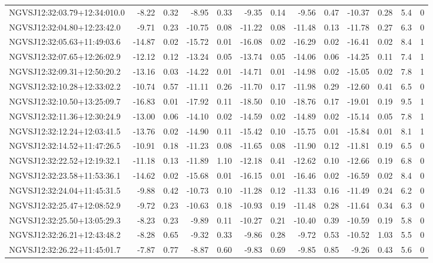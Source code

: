 \begin{tabular}{lrrrrrrrrrrcc}
NGVSJ12:32:03.79+12:34:010.0 & -8.22 & 0.32 & -8.95 & 0.33 & -9.35 & 0.14 & -9.56 & 0.47 & -10.37 & 0.28 & 5.4 & 0 \\
NGVSJ12:32:04.80+12:23:42.0 & -9.71 & 0.23 & -10.75 & 0.08 & -11.22 & 0.08 & -11.48 & 0.13 & -11.78 & 0.27 & 6.3 & 0 \\
NGVSJ12:32:05.63+11:49:03.6 & -14.87 & 0.02 & -15.72 & 0.01 & -16.08 & 0.02 & -16.29 & 0.02 & -16.41 & 0.02 & 8.4 & 1 \\
NGVSJ12:32:07.65+12:26:02.9 & -12.12 & 0.12 & -13.24 & 0.05 & -13.74 & 0.05 & -14.06 & 0.06 & -14.25 & 0.11 & 7.4 & 1 \\
NGVSJ12:32:09.31+12:50:20.2 & -13.16 & 0.03 & -14.22 & 0.01 & -14.71 & 0.01 & -14.98 & 0.02 & -15.05 & 0.02 & 7.8 & 1 \\
NGVSJ12:32:10.28+12:33:02.2 & -10.74 & 0.57 & -11.11 & 0.26 & -11.70 & 0.17 & -11.98 & 0.29 & -12.60 & 0.41 & 6.5 & 0 \\
NGVSJ12:32:10.50+13:25:09.7 & -16.83 & 0.01 & -17.92 & 0.11 & -18.50 & 0.10 & -18.76 & 0.17 & -19.01 & 0.19 & 9.5 & 1 \\
NGVSJ12:32:11.36+12:30:24.9 & -13.00 & 0.06 & -14.10 & 0.02 & -14.59 & 0.02 & -14.89 & 0.02 & -15.14 & 0.05 & 7.8 & 1 \\
NGVSJ12:32:12.24+12:03:41.5 & -13.76 & 0.02 & -14.90 & 0.11 & -15.42 & 0.10 & -15.75 & 0.01 & -15.84 & 0.01 & 8.1 & 1 \\
NGVSJ12:32:14.52+11:47:26.5 & -10.91 & 0.18 & -11.23 & 0.08 & -11.65 & 0.08 & -11.90 & 0.12 & -11.81 & 0.19 & 6.5 & 0 \\
NGVSJ12:32:22.52+12:19:32.1 & -11.18 & 0.13 & -11.89 & 1.10 & -12.18 & 0.41 & -12.62 & 0.10 & -12.66 & 0.19 & 6.8 & 0 \\
NGVSJ12:32:23.58+11:53:36.1 & -14.62 & 0.02 & -15.68 & 0.01 & -16.15 & 0.01 & -16.46 & 0.02 & -16.59 & 0.02 & 8.4 & 0 \\
NGVSJ12:32:24.04+11:45:31.5 & -9.88 & 0.42 & -10.73 & 0.10 & -11.28 & 0.12 & -11.33 & 0.16 & -11.49 & 0.24 & 6.2 & 0 \\
NGVSJ12:32:25.47+12:08:52.9 & -9.72 & 0.23 & -10.63 & 0.18 & -10.93 & 0.19 & -11.48 & 0.28 & -11.64 & 0.34 & 6.3 & 0 \\
NGVSJ12:32:25.50+13:05:29.3 & -8.23 & 0.23 & -9.89 & 0.11 & -10.27 & 0.21 & -10.40 & 0.39 & -10.59 & 0.19 & 5.8 & 0 \\
NGVSJ12:32:26.21+12:43:48.2 & -8.28 & 0.65 & -9.32 & 0.33 & -9.86 & 0.28 & -9.72 & 0.53 & -10.52 & 1.03 & 5.5 & 0 \\
NGVSJ12:32:26.22+11:45:01.7 & -7.87 & 0.77 & -8.87 & 0.60 & -9.83 & 0.69 & -9.85 & 0.85 & -9.26 & 0.43 & 5.6 & 0 \\

\end{tabular}
